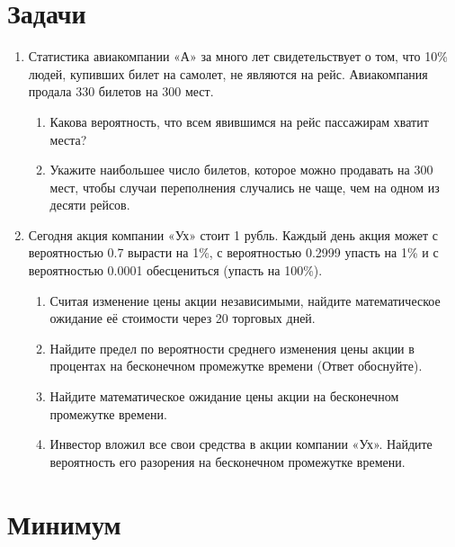 \documentclass[11pt]{article} %
\begin{document}
\section{Задачи}

\begin{enumerate}[resume]

\item Статистика авиакомпании «А» за много лет свидетельствует о том, что 10\% людей, купивших билет на самолет, не являются на рейс. Авиакомпания продала 330 билетов на 300 мест.
\begin{enumerate}
\item Какова вероятность, что всем явившимся на рейс пассажирам хватит места?
\item Укажите наибольшее число билетов, которое можно продавать на 300 мест, чтобы случаи переполнения случались не чаще, чем на одном из десяти рейсов.
\end{enumerate}

\item Сегодня акция компании «Ух» стоит 1 рубль. Каждый день акция может с вероятностью 0.7 вырасти на 1\%, с вероятностью 0.2999 упасть на 1\% и с вероятностью 0.0001 обесцениться (упасть на 100\%).
\begin{enumerate}
\item Считая изменение цены акции независимыми, найдите математическое ожидание её стоимости через 20 торговых дней.
\item Найдите предел по вероятности среднего изменения цены акции в процентах на бесконечном промежутке времени (Ответ обоснуйте).
\item Найдите математическое ожидание цены акции на бесконечном промежутке времени.
\item Инвестор вложил все свои средства в акции компании «Ух». Найдите вероятность его разорения на бесконечном промежутке времени.
\end{enumerate}


\end{enumerate}



\newpage
\setcounter{page}{1}
\setcounter{section}{0}
\chead{}
\cfoot{}
\rfoot{\thepage/\pageref{LastPage}}

\section{Минимум}
\end{document}
